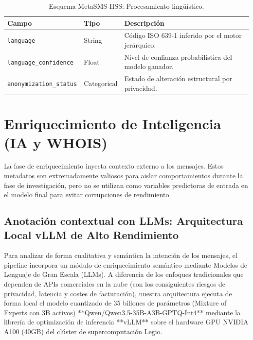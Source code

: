 \begin{table}[htbp]
    \centering
    \caption{Esquema MetaSMS-HSS: Procesamiento lingüístico.}
    \label{tab:esquema_linguistico}
    \small
    \begin{tabular}{llp{7cm}}
        \toprule
        \textbf{Campo} & \textbf{Tipo} & \textbf{Descripción} \\
        \midrule
        \texttt{language} & String & Código ISO 639-1 inferido por el motor jerárquico. \\
        \texttt{language\_confidence} & Float & Nivel de confianza probabilística del modelo ganador. \\
        \texttt{anonymization\_status} & Categorical & Estado de alteración estructural por privacidad. \\
        \bottomrule
    \end{tabular}
\end{table}

\section{Enriquecimiento de Inteligencia (IA y WHOIS)}
\label{sec:enriquecimiento}

La fase de enriquecimiento inyecta contexto externo a los mensajes. Estos metadatos son extremadamente valiosos para aislar comportamientos durante la fase de investigación, pero no se utilizan como variables predictoras de entrada en el modelo final para evitar corrupciones de rendimiento.

\subsection{Anotación contextual con LLMs: Arquitectura Local vLLM de Alto Rendimiento}
\label{subsec:anotacion_llm}

Para analizar de forma cualitativa y semántica la intención de los mensajes, el pipeline incorpora un módulo de enriquecimiento semántico mediante Modelos de Lenguaje de Gran Escala (\glspl{LLM}). A diferencia de los enfoques tradicionales que dependen de APIs comerciales en la nube (con los consiguientes riesgos de privacidad, latencia y costes de facturación), nuestra arquitectura ejecuta de forma local el modelo cuantizado de 35 billones de parámetros (Mixture of Experts con 3B activos) **Qwen/Qwen3.5-35B-A3B-GPTQ-Int4** mediante la librería de optimización de inferencia **vLLM** sobre el hardware GPU NVIDIA A100 (40GB) del clúster de supercomputación Legio.

